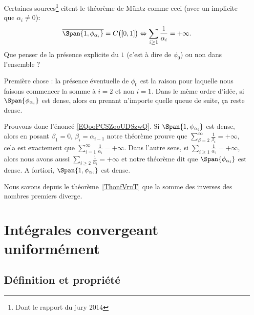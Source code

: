 \begin{remark}      \label{REMooGPYYooCQJwFa}
    Certaines sources\footnote{Dont le rapport du jury 2014} citent le théorème de Müntz comme ceci (avec un implicite que \( \alpha_i\neq 0\)):
    \begin{equation}        \label{EQooPCSZooUDSzwQ}
        \overline{ \Span\{1, \phi_{\alpha_i} \} }=C\big( \mathopen[ 0 , 1 \mathclose] \big) \Leftrightarrow \sum_{i\geq 1}\frac{1}{ \alpha_i }=+\infty.
    \end{equation}
    Que penser de la présence explicite du \( 1\) (c'est à dire de \( \phi_0\)) ou non dans l'ensemble ?

    Première chose : la présence éventuelle de \( \phi_0\) est la raison pour laquelle nous faisons commencer la somme à \( i=2\) et non \( i=1\). Dans le même ordre d'idée, si $\Span\{ \phi_{\alpha_i} \}$  est dense, alors en prenant n'importe quelle queue de suite, ça reste dense.

    Prouvons donc l'énoncé \eqref{EQooPCSZooUDSzwQ}. Si \( \Span\{ 1,\phi_{\alpha_i} \}\) est dense, alors en posant \( \beta_1=0\), \( \beta_i=\alpha_{i-1}\) notre théorème prouve que \( \sum_{\beta=2}^{\infty}\frac{1}{ \beta_i }=+\infty\), cela est exactement que \( \sum_{i=1}^{\infty}\frac{1}{ \alpha_i }=+\infty\). Dans l'autre sens, si \( \sum_{i\geq 1}\frac{1}{ \alpha_i }=+\infty\), alors nous avons aussi \( \sum_{i\geq 2}\frac{1}{ \alpha_i }=+\infty\) et notre théorème dit que \( \Span \{ \phi_{\alpha_i} \}\) est dense. A fortiori, \( \Span\{ 1,\phi_{\alpha_i} \}\) est dense.
\end{remark}

\begin{example}
    Nous savons depuis le théorème~\ref{ThonfVruT} que la somme des inverses des nombres premiers diverge.
\end{example}

\section{Intégrales convergeant uniformément}

\subsection{Définition et propriété}


